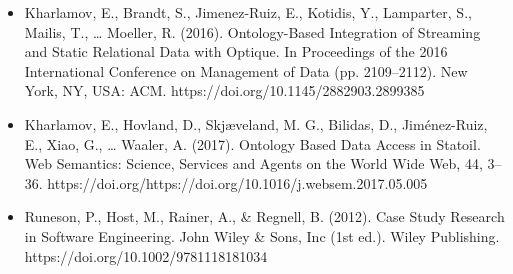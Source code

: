 \begin{itemize}
\item Kharlamov, E., Brandt, S., Jimenez-Ruiz, E., Kotidis, Y., Lamparter, S., Mailis, T., … Moeller, R. (2016). Ontology-Based Integration of Streaming and Static Relational Data with Optique. In Proceedings of the 2016 International Conference on Management of Data (pp. 2109–2112). New York, NY, USA: ACM. https://doi.org/10.1145/2882903.2899385

\item Kharlamov, E., Hovland, D., Skjæveland, M. G., Bilidas, D., Jiménez-Ruiz, E., Xiao, G., … Waaler, A. (2017). Ontology Based Data Access in Statoil. Web Semantics: Science, Services and Agents on the World Wide Web, 44, 3–36. https://doi.org/https://doi.org/10.1016/j.websem.2017.05.005

\item Runeson, P., Host, M., Rainer, A., \& Regnell, B. (2012). Case Study Research in Software Engineering. John Wiley \& Sons, Inc (1st ed.). Wiley Publishing. https://doi.org/10.1002/9781118181034

\end{itemize}


